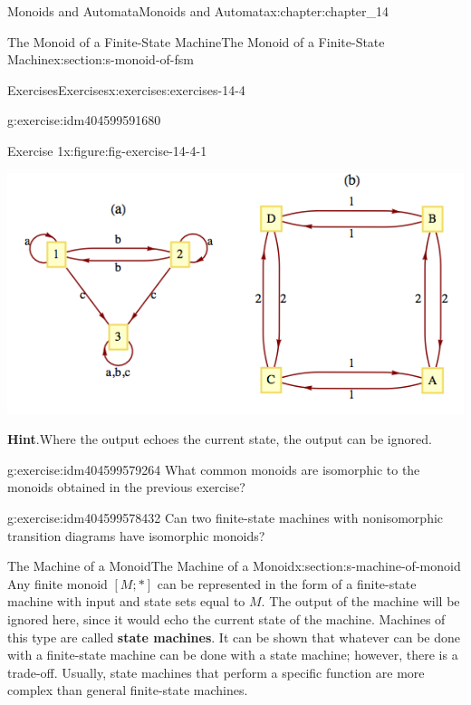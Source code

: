 \documentclass[twoside,10pt,]{book}
\newcommand{\blocktitlefont}{\relax}
\newcommand{\terminology}[1]{\textbf{#1}}
\numberwithin{equation}{section}
\begin{document}
\begin{chapterptx}{Monoids and Automata}{}{Monoids and Automata}{}{}{x:chapter:chapter_14}
\begin{sectionptx}{The Monoid of a Finite-State Machine}{}{The Monoid of a Finite-State Machine}{}{}{x:section:s-monoid-of-fsm}
\begin{exercises-subsection}{Exercises}{}{Exercises}{}{}{x:exercises:exercises-14-4}
\begin{divisionexercise}{1}{}{}{g:exercise:idm404599591680}
\begin{figureptx}{Exercise 1}{x:figure:fig-exercise-14-4-1}{}%
\begin{image}{0.15}{0.7}{0.15}%
\includegraphics[width=\linewidth]{images/fig-exercise-14-4-1.png}
\end{image}%
\tcblower
\end{figureptx}%
\par\smallskip%
\noindent\textbf{\blocktitlefont Hint}.\label{g:hint:idm404599588672}{}\hypertarget{g:hint:idm404599588672}{}\quad{}Where the output echoes the current state, the output can be ignored.%
\end{divisionexercise}%
\begin{divisionexercise}{2}{}{}{g:exercise:idm404599579264}%
What common monoids are isomorphic to the monoids obtained in the previous exercise?%
\end{divisionexercise}%
\begin{divisionexercise}{3}{}{}{g:exercise:idm404599578432}%
Can two finite-state machines with nonisomorphic transition diagrams have isomorphic monoids?%
\end{divisionexercise}%
\end{exercises-subsection}
\end{sectionptx}
%
%
\typeout{************************************************}
\typeout{************************************************}
%
\begin{sectionptx}{The Machine of a Monoid}{}{The Machine of a Monoid}{}{}{x:section:s-machine-of-monoid}
%
Any finite monoid \([M;*]\) can be represented in the form of a finite-state machine with input and state sets equal to \(M\). The output of the machine will be ignored here, since it would echo the current state of the machine. Machines of this type are called \terminology{state machines}. It can be shown that whatever can be done with a finite-state machine can be done with a state machine; however, there is a trade-off. Usually, state machines that perform a specific function are more complex than general finite-state machines.%

\end{sectionptx}
\end{chapterptx}
\end{document}
